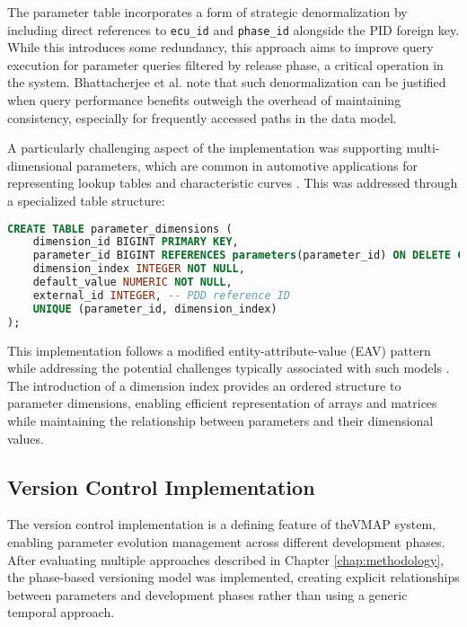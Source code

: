 The parameter table incorporates a form of strategic denormalization by including direct references to \texttt{ecu\_id} and \texttt{phase\_id} alongside the PID foreign key. While this introduces some redundancy, this approach aims to improve query execution for parameter queries filtered by release phase, a critical operation in the system. Bhattacherjee et al. \cite{bhattacherjee2015principles} note that such denormalization can be justified when query performance benefits outweigh the overhead of maintaining consistency, especially for frequently accessed paths in the data model.

A particularly challenging aspect of the implementation was supporting multi-dimensional parameters, which are common in automotive applications for representing lookup tables and characteristic curves \cite{kiencke2000automotive}. This was addressed through a specialized table structure:

\begin{lstlisting}[language=SQL, caption={Parameter Dimension Implementation}, label={lst:parameter-dimension}]
CREATE TABLE parameter_dimensions (
    dimension_id BIGINT PRIMARY KEY,
    parameter_id BIGINT REFERENCES parameters(parameter_id) ON DELETE CASCADE,
    dimension_index INTEGER NOT NULL,
    default_value NUMERIC NOT NULL,
    external_id INTEGER, -- PDD reference ID
    UNIQUE (parameter_id, dimension_index)
);
\end{lstlisting}

This implementation follows a modified entity-attribute-value (EAV) pattern while addressing the potential challenges typically associated with such models \cite{nadkarni2016revisiting}. The introduction of a dimension index provides an ordered structure to parameter dimensions, enabling efficient representation of arrays and matrices while maintaining the relationship between parameters and their dimensional values.

\subsection{Version Control Implementation}
\label{subsec:version-control-implementation}

The version control implementation is a defining feature of the\ac{VMAP} system, enabling parameter evolution management across different development phases. After evaluating multiple approaches described in Chapter \ref{chap:methodology}, the phase-based versioning model was implemented, creating explicit relationships between parameters and development phases rather than using a generic temporal approach.

